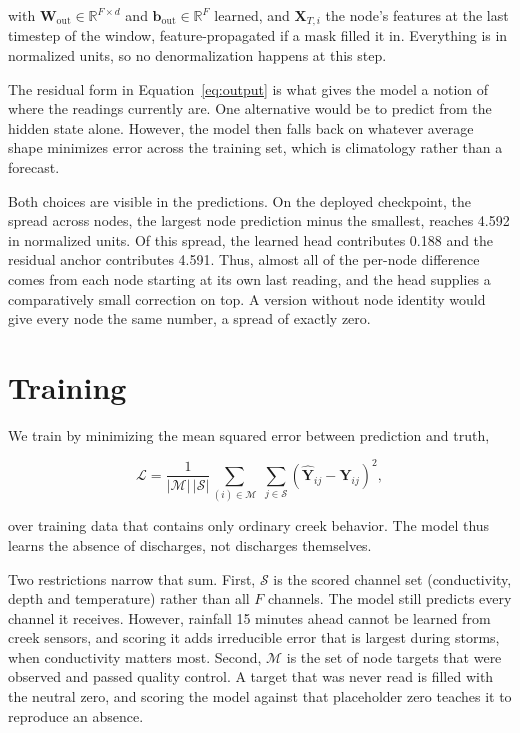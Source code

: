 \documentclass{article}
\begin{document}
with $\mathbf{W}_{\text{out}} \in \mathbb{R}^{F \times d}$ and
$\mathbf{b}_{\text{out}} \in \mathbb{R}^{F}$ learned, and $\mathbf{X}_{T,i}$ the
node's features at the last timestep of the window, feature-propagated if a mask
filled it in. Everything is in normalized units, so no denormalization happens
at this step.

The residual form in Equation~\ref{eq:output} is what gives the model a notion
of where the readings currently are. One alternative would be to predict from
the hidden state alone. However, the model then falls back on whatever average
shape minimizes error across the training set, which is climatology rather
than a forecast.

Both choices are visible in the predictions. On the deployed checkpoint, the
spread across nodes, the largest node prediction minus the smallest, reaches
4.592 in normalized units. Of this spread, the learned head contributes 0.188
and the residual anchor contributes 4.591. Thus, almost all of the per-node
difference comes from each node starting at its own last reading, and the head
supplies a comparatively small correction on top. A version without node
identity would give every node the same number, a spread of exactly zero.

\section{Training}
\label{sec:training}

We train by minimizing the mean squared error between prediction and truth,

\begin{equation}
  \label{eq:loss}
  \mathcal{L} = \frac{1}{\lvert \mathcal{M} \rvert \, \lvert \mathcal{S} \rvert} \sum_{(i) \in \mathcal{M}} \; \sum_{j \in \mathcal{S}} \left( \hat{\mathbf{Y}}_{ij} - \mathbf{Y}_{ij} \right)^2,
\end{equation}

over training data that contains only ordinary creek behavior. The model thus
learns the absence of discharges, not discharges themselves.

Two restrictions narrow that sum. First, $\mathcal{S}$ is the scored channel
set (conductivity, depth and temperature) rather than all $F$ channels. The
model still predicts every channel it receives. However, rainfall 15 minutes
ahead cannot be learned from creek sensors, and scoring it adds irreducible
error that is largest during storms, when conductivity matters most. Second,
$\mathcal{M}$ is the set of node targets that were observed and passed quality
control. A target that was never read is filled with the neutral zero, and
scoring the model against that placeholder zero teaches it to reproduce an
absence.
\end{document}
